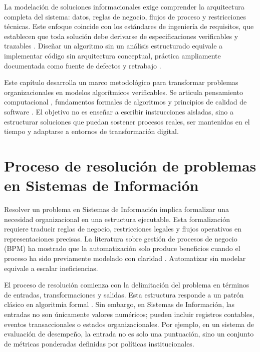 \documentclass[12pt,twoside]{book}
\begin{document}
			La modelación de soluciones informacionales exige comprender la arquitectura completa del sistema: datos, reglas de negocio, flujos de proceso y restricciones técnicas. Este enfoque coincide con los estándares de ingeniería de requisitos, que establecen que toda solución debe derivarse de especificaciones verificables y trazables \cite{ISOIECIEEE2018Requirements}. Diseñar un algoritmo sin un análisis estructurado equivale a implementar código sin arquitectura conceptual, práctica ampliamente documentada como fuente de defectos y retrabajo \cite{Ghezzi2003Fundamentals,McConnell2004Code}.
			
			Este capítulo desarrolla un marco metodológico para transformar problemas organizacionales en modelos algorítmicos verificables. Se articula pensamiento computacional \cite{Wing2006Computational}, fundamentos formales de algoritmos \cite{Knuth1997Art,Cormen2022Introduction} y principios de calidad de software \cite{SWEBOK2025Guide}. El objetivo no es enseñar a escribir instrucciones aisladas, sino a estructurar soluciones que puedan sostener procesos reales, ser mantenidas en el tiempo y adaptarse a entornos de transformación digital.
			
			\section{Proceso de resolución de problemas en Sistemas de Información}
				\noindent
				Resolver un problema en Sistemas de Información implica formalizar una necesidad organizacional en una estructura ejecutable. Esta formalización requiere traducir reglas de negocio, restricciones legales y flujos operativos en representaciones precisas. La literatura sobre gestión de procesos de negocio (BPM) ha mostrado que la automatización solo produce beneficios cuando el proceso ha sido previamente modelado con claridad \cite{Anand2013Literature,MartinNavarro2023BPMS}. Automatizar sin modelar equivale a escalar ineficiencias.
				
				El proceso de resolución comienza con la delimitación del problema en términos de entradas, transformaciones y salidas. Esta estructura responde a un patrón clásico en algoritmia formal \cite{Wirth1976Algorithms,Cormen2022Introduction}. Sin embargo, en Sistemas de Información, las entradas no son únicamente valores numéricos; pueden incluir registros contables, eventos transaccionales o estados organizacionales. Por ejemplo, en un sistema de evaluación de desempeño, la entrada no es solo una puntuación, sino un conjunto de métricas ponderadas definidas por políticas institucionales.
				
\end{document}

